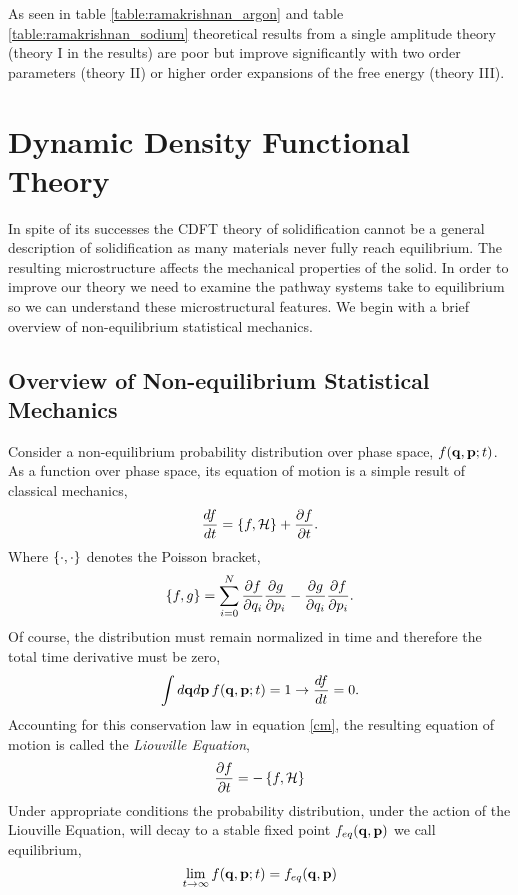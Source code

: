 As seen in table \ref{table:ramakrishnan_argon} and table
\ref{table:ramakrishnan_sodium} theoretical results from a single amplitude
theory (theory I in the results) are poor but improve significantly with two
order parameters (theory II) or higher order expansions of the free energy
(theory III).

\section{Dynamic Density Functional Theory} %

In spite of its successes the CDFT theory of solidification cannot be a general
description of solidification as many materials never fully reach equilibrium.
The resulting microstructure affects the mechanical properties of the solid. In
order to improve our theory we need to examine the pathway systems take to
equilibrium so we can understand these microstructural features. We begin with
a brief overview of non-equilibrium statistical mechanics.

\subsection{Overview of Non-equilibrium Statistical Mechanics} %

Consider a non-equilibrium probability distribution over phase space, $f(\mathbf{q},
\mathbf{p}; t)$. As a function over phase space, its equation of motion is a simple
result of classical mechanics,
%
\begin{equation}
    \label{cm} 
    \frac{d f}{dt} = \left\lbrace f, \mathcal{H} \right\rbrace + \frac{\partial f}{\partial t}.
\end{equation}
%
Where $\left\lbrace \cdot, \cdot \right\rbrace$ denotes the Poisson bracket,
%
\begin{equation}
    \left\lbrace f, g \right\rbrace = \sum_{i = 0}^N \frac{\partial f}{\partial q_i}
        \frac{\partial g}{\partial p_i} - \frac{\partial g}{\partial q_i}
        \frac{\partial f}{\partial p_i}.
\end{equation}
%
Of course, the distribution must remain normalized in time and therefore the 
total time derivative must be zero,
%
\begin{equation}
    \int d\mathbf{q} d\mathbf{p}\, f(\mathbf{q}, \mathbf{p}; t) = 1 \rightarrow \frac{d f}{dt} = 0.
\end{equation}
%
Accounting for this conservation law in equation \ref{cm}, the resulting
equation of motion is called the \textit{Liouville Equation},
%
\begin{equation}
    \label{liouville} 
    \frac{\partial f}{\partial t} = - \left\lbrace f , \mathcal{H} \right\rbrace
\end{equation}
%
Under appropriate conditions the probability distribution, under the action of
the Liouville Equation, will decay to a stable fixed point $f_{eq}(\mathbf{q}, \mathbf{p})$ we
call equilibrium,
%
\begin{equation}
    \lim_{t \rightarrow \infty} f(\mathbf{q}, \mathbf{p}; t) = f_{eq}(\mathbf{q}, \mathbf{p})
\end{equation}
%

